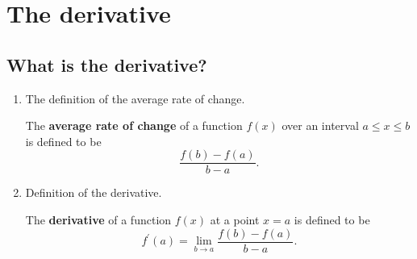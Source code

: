 \chapter{The derivative}
\section{What is the derivative?}
\begin{enumerate}
    \item The definition of the average rate of change.

        The \textbf{average rate of change} of a function $f(x)$ over an interval $a\leq x\leq b$ is defined to be
        $$
        \frac{f(b)-f(a)}{b-a}.
        $$
    \item Definition of the derivative.

        The \textbf{derivative} of a function $f(x)$ at a point $x=a$ is defined to be
        $$
        f^\prime(a)=\lim_{b\to a}\frac{f(b)-f(a)}{b-a}.
        $$
\end{enumerate}

